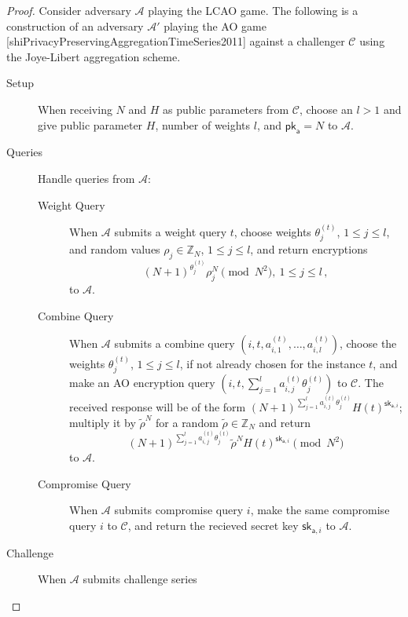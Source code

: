 \begin{proof}
    Consider adversary $\mathcal{A}$ playing the LCAO game. The following is a construction of an adversary $\mathcal{A}'$ playing the AO game [shiPrivacyPreservingAggregationTimeSeries2011] against a challenger $\mathcal{C}$ using the Joye-Libert aggregation scheme.
    \begin{description}
        \item[Setup] When receiving $N$ and $H$ as public parameters from $\mathcal{C}$, choose an $l>1$ and give public parameter $H$, number of weights $l$, and $\mathsf{pk}_{\mathsf{a}}=N$ to $\mathcal{A}$.
        \item[Queries] Handle queries from $\mathcal{A}$:
        \begin{description}
            \item[Weight Query] When $\mathcal{A}$ submits a weight query $t$, choose weights $\theta^{(t)}_j$, $1\leq j\leq l$, and random values $\rho_j \in \mathbb{Z}_N$, $1\leq j\leq l$, and return encryptions 
            \begin{equation*}
                (N+1)^{\theta^{(t)}_{j}}\rho_j^N\pmod{N^2},\ 1\leq j\leq l\,,
            \end{equation*}
            to $\mathcal{A}$.
            \item[Combine Query] When $\mathcal{A}$ submits a combine query $(i, t, a^{(t)}_{i,1},\dots,a^{(t)}_{i,l})$, choose the weights $\theta^{(t)}_j$, $1\leq j\leq l$, if not already chosen for the instance $t$, and make an AO encryption query $(i, t, \sum^l_{j=1}a^{(t)}_{i,j}\theta^{(t)}_j)$ to $\mathcal{C}$. The received response will be of the form $(N+1)^{\sum^l_{j=1}a^{(t)}_{i,j}\theta^{(t)}_j}H(t)^{\mathsf{sk}_{\mathsf{a},i}}$; multiply it by $\tilde{\rho}^N$ for a random $\tilde{\rho} \in \mathbb{Z}_N$ and return 
            \begin{equation*}
                (N+1)^{\sum^l_{j=1}a^{(t)}_{i,j}\theta^{(t)}_j}\tilde{\rho}^N H(t)^{\mathsf{sk}_{\mathsf{a},i}} \pmod{N^2}
            \end{equation*}
            to $\mathcal{A}$.
            \item[Compromise Query] When $\mathcal{A}$ submits compromise query $i$, make the same compromise query $i$ to $\mathcal{C}$, and return the recieved secret key $\mathsf{sk}_{\mathsf{a},i}$ to $\mathcal{A}$.
        \end{description}
        \item[Challenge] When $\mathcal{A}$ submits challenge series

\end{description}
\end{proof}
